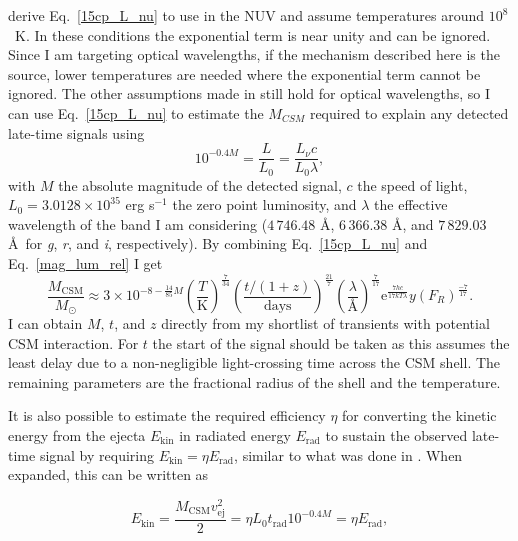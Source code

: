 \documentclass[a4paper,oneside,12pt, class=Latex/Classes/PhDthesisPSnPDF, crop=false]{standalone}
\begin{document}
\citet{2015cp} derive Eq.~\ref{15cp_L_nu} to use in the NUV and assume temperatures around $10^8$~K. In these conditions the exponential term is near unity and can be ignored. Since I am targeting optical wavelengths, if the mechanism described here is the source, lower temperatures are needed where the exponential term cannot be ignored. The other assumptions made in \citet{2015cp} still hold for optical wavelengths, so I can use Eq.~\ref{15cp_L_nu} to estimate the $M_{CSM}$ required to explain any detected late-time signals using
\begin{equation}
    \label{mag_lum_rel}
    10^{-0.4M} = \frac{L}{L_0} = \frac{L_\nu c}{L_0 \lambda},
\end{equation}
with $M$ the absolute magnitude of the detected signal, $c$ the speed of light, $L_0 = 3.0128 \times 10^{35}$ erg s$^{-1}$ the zero point luminosity, and $\lambda$ the effective wavelength of the band I am considering ($4\,746.48$ \AA, $6\,366.38$ \AA, and $7\,829.03$ \AA~for \textit{g}, \textit{r}, and \textit{i}, respectively). By combining Eq.~\ref{15cp_L_nu} and Eq.~\ref{mag_lum_rel} I get
\begin{equation}
    \frac{M_\text{CSM}}{M_\odot} \approx 3 \times 10^{-8-\frac{14}{85}M} \left(\frac{T}{\text{K}}\right)^{\frac{7}{34}} \left(\frac{t/(1+z)}{\text{days}}\right)^{\frac{21}{7}} \left(\frac{\lambda}{\text{\AA}}\right)^{\frac{7}{17}} \text{e}^{\frac{7hc}{17kT\lambda}} y(F_R)^{\frac{-7}{17}}.
    \label{M_CSM_eq}
\end{equation}
I can obtain $M$, $t$, and $z$ directly from my shortlist of transients with potential CSM interaction. For $t$ the start of the signal should be taken as this assumes the least delay due to a non-negligible light-crossing time across the CSM shell. The remaining parameters are the fractional radius of the shell and the temperature.

It is also possible to estimate the required efficiency $\eta$ for converting the kinetic energy from the ejecta $E_\text{kin}$ in radiated energy $E_\text{rad}$ to sustain the observed late-time signal by requiring $E_\text{kin} = \eta E_\text{rad}$, similar to what was done in \citet{2009ip_Fraser}. When expanded, this can be written as

\begin{equation}
    E_\text{kin} = \frac{M_\text{CSM} v_\text{ej}^2}{2} = \eta L_0 t_\text{rad} 10^{-0.4M} = \eta E_\text{rad},
    \label{Ekin_Erad}
\end{equation}
\end{document}
